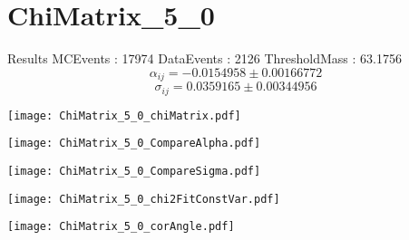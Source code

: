 \documentclass[a4paper,12pt]{article}
\begin{document}
\section{ChiMatrix\_5\_0}
\begin{minipage}{0.49\linewidth} Results \newline
MCEvents : 17974\newline
DataEvents : 2126 \newline
ThresholdMass : 63.1756\\
$$\alpha_{ij} = -0.0154958\pm 0.00166772$$
$$\sigma_{ij} = 0.0359165\pm 0.00344956$$
\end{minipage}\hfill
\begin{minipage}{0.49\linewidth} 
\texttt{[image: ChiMatrix\_5\_0\_chiMatrix.pdf]}\\
\end{minipage}
\hfill
\begin{minipage}{0.49\linewidth} 
\texttt{[image: ChiMatrix\_5\_0\_CompareAlpha.pdf]}\\
\end{minipage}
\hfill
\begin{minipage}{0.49\linewidth} 
\texttt{[image: ChiMatrix\_5\_0\_CompareSigma.pdf]}\\
\end{minipage}
\begin{minipage}{0.49\linewidth} 
\texttt{[image: ChiMatrix\_5\_0\_chi2FitConstVar.pdf]}\\
\end{minipage}
\hfill
\begin{minipage}{0.49\linewidth} 
\texttt{[image: ChiMatrix\_5\_0\_corAngle.pdf]}\\
\end{minipage}
\end{document}
